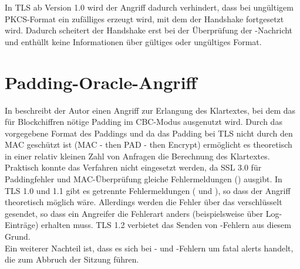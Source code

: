 In TLS ab Version 1.0 wird der Angriff dadurch verhindert, dass bei ungültigem PKCS-Format ein zufälliges \premastersecret{} erzeugt wird, mit dem der Handshake fortgesetzt wird. Dadurch scheitert der Handshake erst bei der Überprüfung der \finished{}-Nachricht und enthüllt keine Informationen über gültiges oder ungültiges Format.

\section{Padding-Oracle-Angriff}

In \cite{vaudenay02} beschreibt der Autor einen Angriff zur Erlangung des Klartextes, bei dem das für Blockchiffren nötige Padding im CBC-Modus ausgenutzt wird. Durch das vorgegebene Format des Paddings und da das Padding bei TLS nicht durch den MAC geschützt ist (MAC - then PAD - then Encrypt) ermöglicht es theoretisch in einer relativ kleinen Zahl von Anfragen die Berechnung des Klartextes.\\
Praktisch konnte das Verfahren nicht eingesetzt werden, da SSL 3.0 für Paddingfehler und MAC-Überprüfung gleiche Fehlermeldungen (\badrecordmac{}) ausgibt. In TLS 1.0 und 1.1 gibt es getrennte Fehlermeldungen (\badrecordmac{} und \decryptionfailed{}), so dass der Angriff theoretisch möglich wäre. Allerdings werden die Fehler über das \alertprotocol{} verschlüsselt gesendet, so dass ein Angreifer die Fehlerart anders (beispielsweise über Log-Einträge) erhalten muss. TLS 1.2 verbietet das Senden von \decryptionfailed{}-Fehlern aus diesem Grund.\\
Ein weiterer Nachteil ist, dass es sich bei \badrecordmac{}- und \decryptionfailed{}-Fehlern um fatal alerts handelt, die zum Abbruch der Sitzung führen.

